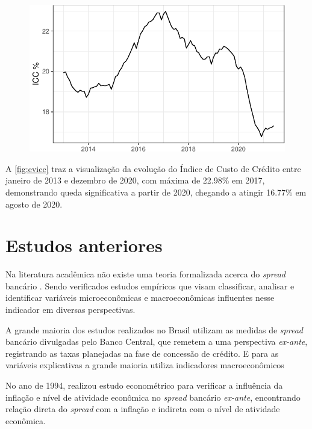 \documentclass[12pt,12pt,openright,oneside,a4paper,chapter=TITLE,section=TITLE,subsection=TITLE,subsubsection=TITLE,english,french,spanish,portugues,sumario=tradicional]{abntex2}
\begin{document}
\begin{figure}

\begin{center}\includegraphics{12-exportedfigures/ICC-1} \end{center}
\label{fig:evicc}
\end{figure}

A \autoref{fig:evicc} traz a visualização da evolução do Índice de Custo de
Crédito entre janeiro de 2013 e dezembro de 2020, com máxima de 22.98\% em
2017, demonstrando queda significativa a partir de 2020, chegando a atingir 16.77\% em agosto de 2020.

\section{Estudos anteriores}

Na literatura acadêmica não existe uma teoria formalizada acerca do \emph{spread}
bancário \cite{timotio:2018}. Sendo verificados estudos empíricos que visam
classificar, analisar e identificar variáveis microeconômicas e macroeconômicas
influentes nesse indicador em diversas perspectivas.

A grande maioria dos estudos realizados no Brasil utilizam as medidas de
\emph{spread} bancário divulgadas pelo Banco Central, que remetem a uma perspectiva
\emph{ex-ante}, registrando as taxas planejadas na fase de concessão de crédito. E
para as variáveis explicativas a grande maioria utiliza indicadores
macroeconômicos \cite{dantas:2012}

No ano de 1994, \textcite{aronovich:1994} realizou estudo econométrico para
verificar a influência da inflação e nível de atividade econômica no \emph{spread}
bancário \emph{ex-ante}, encontrando relação direta do \emph{spread} com a inflação e
indireta com o nível de atividade econômica.
\end{document}
